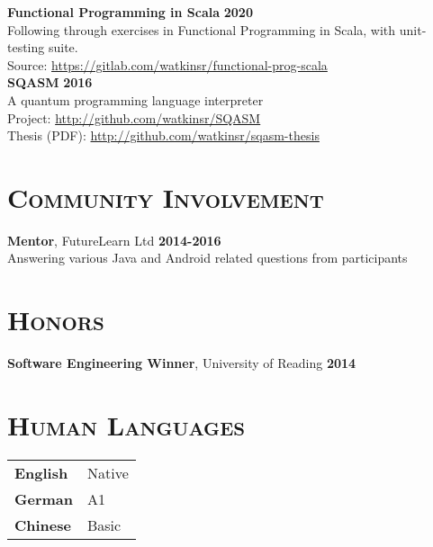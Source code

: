\documentclass[line, margin, 10pt]{res}
\begin{document}
\begin{resume}
{\bf Functional Programming in Scala} {\bf \hfill 2020}\\
Following through exercises in Functional Programming in Scala, with unit-testing suite.\\
Source: \url{https://gitlab.com/watkinsr/functional-prog-scala}\\

{\bf SQASM} {\bf \hfill 2016}\\
A quantum programming language interpreter\\
Project: \url{http://github.com/watkinsr/SQASM}\\
Thesis (PDF): \url{http://github.com/watkinsr/sqasm-thesis}\\


\section{\textsc{Community Involvement}}

{\bf Mentor}, FutureLearn Ltd {\bf \hfill 2014-2016}\\
Answering various Java and Android related questions from participants

\section{\textsc{Honors}}

{\bf Software Engineering Winner}, University of Reading {\bf \hfill 2014}\\

\section{\textsc{Human Languages}}

\begin{tabular}[t]{@{} p{1.2in} p{3.75in} @{}}

\textbf{English} & Native\\ 
\textbf{German} & A1 \\
\textbf{Chinese} & Basic

\end{tabular}

\end{resume}
\end{document}
